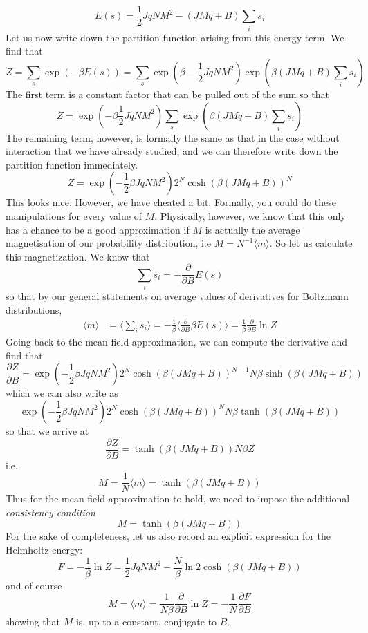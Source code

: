 \documentclass[a4paper, draft]{article}
\theoremstyle{own}
\theoremstyle{remark}
\begin{document}
$$
E(s) = \frac{1}{2} J q N M^2  - (J M q + B) \sum_i s_i
$$
Let us now write down the partition function arising from this energy term. We find that
$$
Z = \sum_s \exp(- \beta E(s)) = \sum_s \exp(\beta -\frac{1}{2} J q N M^2) \exp( \beta (J M q + B) \sum_i s_i)
$$
The first term is a constant factor that can be pulled out of the sum so that
$$
Z = \exp( -\beta \frac{1}{2} J q N M^2) \sum_s  \exp( \beta (J M q + B) \sum_i s_i)
$$
The remaining term, however, is formally the same as that in the case without interaction that we have already studied, and we can therefore write down the partition function immediately.
$$
Z = \exp( - \frac{1}{2} \beta J q N M^2) 2^N \cosh(\beta (J M q + B))^N
$$
This looks nice. However, we have cheated a bit. Formally, you could do these manipulations for every value of $M$. Physically, however, we know that this only has a chance to be a good approximation if $M$ is actually the average magnetisation of our probability distribution, i.e $M = N^{-1} \langle m \rangle$. So let us calculate this magnetization. We know that
$$
\sum_i s_i = - \frac{\partial}{\partial B} E(s)
$$
so that by our general statements on average values of derivatives for Boltzmann distributions,
\begin{align*}
\langle m \rangle &= \langle \sum_i s_i \rangle  = - \frac{1}{\beta} \langle \frac{\partial}{\partial B} \beta E(s)  \rangle  
= \frac{1}{\beta} \frac{\partial}{\partial B} \ln Z
\end{align*}
Going back to the mean field approximation, we can compute the derivative and find that
$$
\frac{\partial Z}{\partial B} = \exp( - \frac{1}{2} \beta J q N M^2) 2^N \cosh (\beta (J M q + B))^{N-1} N \beta  \sinh (\beta (J M q + B))
$$
which we can also write as
$$
\exp( - \frac{1}{2} \beta J q N M^2) 2^N \cosh (\beta (J M q + B))^N  N \beta \tanh (\beta (J M q + B))
$$
so that we arrive at
$$
\frac{\partial Z}{\partial B} = \tanh (\beta (J M q + B)) N \beta Z
$$
i.e.
$$
M = \frac{1}{N}  \langle m \rangle = \tanh (\beta (J M q + B)) 
$$
Thus for the mean field approximation to hold, we need to impose the additional {\em consistency condition}
$$
M = \tanh (\beta (J M q + B)) 
$$
For the sake of completeness, let us also record an explicit expression for the Helmholtz energy:
$$
F = -\frac{1}{\beta} \ln Z =  \frac{1}{2} J q N M^2 - \frac{N}{\beta} \ln  2 \cosh(\beta (J M q + B))
$$
and of course
$$
M = \langle m \rangle = \frac{1}{N \beta} \frac{\partial}{\partial B} \ln Z = - \frac{1}{N} \frac{\partial F}{\partial B}
$$
showing that $M$ is, up to a constant, conjugate to $B$. 
\end{document}
